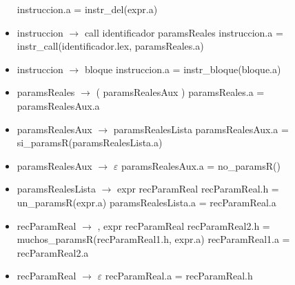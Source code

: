 \documentclass[11pt]{article}
\begin{document}
\begin{itemize}
                \subitem instruccion.a = instr\_del(expr.a)
            \item instruccion $\rightarrow$ call identificador paramsReales
                \subitem instruccion.a = instr\_call(identificador.lex, paramsReales.a)
            \item instruccion $\rightarrow$ bloque
                \subitem instruccion.a = instr\_bloque(bloque.a)
            \item paramsReales $\rightarrow$ ( paramsRealesAux )
                \subitem paramsReales.a = paramsRealesAux.a
            \item paramsRealesAux $\rightarrow$ paramsRealesLista
                \subitem paramsRealesAux.a = si\_paramsR(paramsRealesLista.a)
            \item paramsRealesAux $\rightarrow$ $\varepsilon$
                \subitem paramsRealesAux.a = no\_paramsR()
            \item paramsRealesLista $\rightarrow$ expr recParamReal
                \subitem recParamReal.h = un\_paramsR(expr.a)
                \subitem paramsRealesLista.a = recParamReal.a
            \item recParamReal $\rightarrow$ , expr recParamReal
                \subitem recParamReal2.h = muchos\_paramsR(recParamReal1.h, expr.a)
                \subitem recParamReal1.a = recParamReal2.a
            \item recParamReal $\rightarrow$ $\varepsilon$
                \subitem recParamReal.a = recParamReal.h
        \end{itemize}
        \
\end{document}
